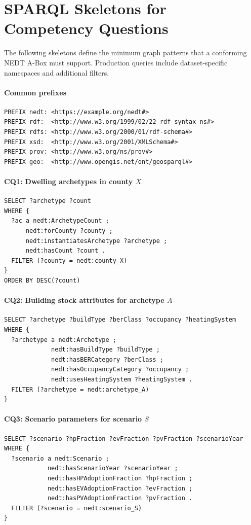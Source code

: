 \documentclass[preprint,12pt]{elsarticle}
\begin{document}
\section{SPARQL Skeletons for Competency Questions}
\label{sec:sparql-skeletons}

The following skeletons define the minimum graph patterns that a
conforming NEDT A-Box must support.
Production queries include dataset-specific namespaces and
additional filters.

\paragraph{Common prefixes}
\begin{verbatim}
PREFIX nedt: <https://example.org/nedt#>
PREFIX rdf:  <http://www.w3.org/1999/02/22-rdf-syntax-ns#>
PREFIX rdfs: <http://www.w3.org/2000/01/rdf-schema#>
PREFIX xsd:  <http://www.w3.org/2001/XMLSchema#>
PREFIX prov: <http://www.w3.org/ns/prov#>
PREFIX geo:  <http://www.opengis.net/ont/geosparql#>
\end{verbatim}

\paragraph{CQ1: Dwelling archetypes in county $X$}
\begin{verbatim}
SELECT ?archetype ?count
WHERE {
  ?ac a nedt:ArchetypeCount ;
      nedt:forCounty ?county ;
      nedt:instantiatesArchetype ?archetype ;
      nedt:hasCount ?count .
  FILTER (?county = nedt:county_X)
}
ORDER BY DESC(?count)
\end{verbatim}

\paragraph{CQ2: Building stock attributes for archetype $A$}
\begin{verbatim}
SELECT ?archetype ?buildType ?berClass ?occupancy ?heatingSystem
WHERE {
  ?archetype a nedt:Archetype ;
             nedt:hasBuildType ?buildType ;
             nedt:hasBERCategory ?berClass ;
             nedt:hasOccupancyCategory ?occupancy ;
             nedt:usesHeatingSystem ?heatingSystem .
  FILTER (?archetype = nedt:archetype_A)
}
\end{verbatim}

\paragraph{CQ3: Scenario parameters for scenario $S$}
\begin{verbatim}
SELECT ?scenario ?hpFraction ?evFraction ?pvFraction ?scenarioYear
WHERE {
  ?scenario a nedt:Scenario ;
            nedt:hasScenarioYear ?scenarioYear ;
            nedt:hasHPAdoptionFraction ?hpFraction ;
            nedt:hasEVAdoptionFraction ?evFraction ;
            nedt:hasPVAdoptionFraction ?pvFraction .
  FILTER (?scenario = nedt:scenario_S)
}
\end{verbatim}
\end{document}
